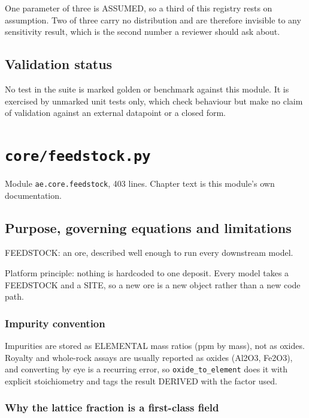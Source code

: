 \documentclass[10pt,a4paper,twoside]{report}
\begin{document}
One parameter of three is ASSUMED, so a third of this registry rests on assumption. Two of three carry no distribution and are therefore invisible to any sensitivity result, which is the second number a reviewer should ask about.

\section{Validation status}

No test in the suite is marked golden or benchmark against this module. It is exercised by unmarked unit tests only, which check behaviour but make no claim of validation against an external datapoint or a closed form.

\clearpage

\chapter{\texttt{core/feedstock.py}}\label{ch:feedstock}


{\footnotesize\color{slate}Module \texttt{ae.core.feedstock}, 403 lines. Chapter text is this module's own documentation.\par}

\section{Purpose, governing equations and limitations}

FEEDSTOCK: an ore, described well enough to run every downstream model.

Platform principle: nothing is hardcoded to one deposit. Every model takes a FEEDSTOCK and a SITE, so a new ore is a new object rather than a new code path.

\subsection*{Impurity convention}

Impurities are stored as ELEMENTAL mass ratios (ppm by mass), not as oxides. Royalty and whole-rock assays are usually reported as oxides (Al2O3, Fe2O3), and converting by eye is a recurring error, so \texttt{oxide\_to\_element} does it with explicit stoichiometry and tags the result DERIVED with the factor used.

\subsection*{Why the lattice fraction is a first-class field}
\end{document}
